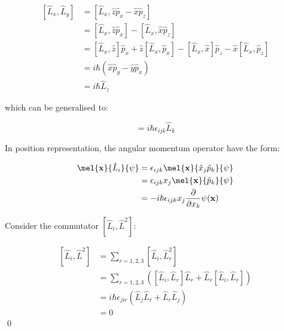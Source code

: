 \documentclass[12pt]{article}
\begin{document}

\begin{equation}
\begin{split}
    [\hat{L}_{x}, \hat{L}_{y}] &= [\hat{L}_{x}, \hat{z} \hat{p}_{x} - \hat{x} \hat{p}_{z}] \\
    &= [\hat{L}_{x}, \hat{z} \hat{p}_{x}] - [\hat{L}_{x}, \hat{x} \hat{p}_{z}] \\
    &= [\hat{L}_{x}, \hat{z}] \hat{p}_{x} + \hat{z} [\hat{L}_{x}, \hat{p}_{x}] - [\hat{L}_{x}, \hat{x}] \hat{p}_{z} - \hat{x} [\hat{L}_{x}, \hat{p}_{z}] \\
    &= i\hbar (\hat{x} \hat{p}_{y} - \hat{y} \hat{p}_{x}) \\
    &= i\hbar \hat{L}_{z}
\end{split}
\end{equation}

which can be generalised to:

\begin{equation}
    [\hat{L}_{i}, \hat{L}_{j}] = i\hbar \epsilon_{ijk} \hat{L}_{k}
\end{equation}

In position representation, the angular momentum operator have the form:

\begin{equation}
\begin{split}
    \mel{\mathbf{x}}{\hat{L}_{i}}{\psi} &= \epsilon_{ijk} \mel{\mathbf{x}}{\hat{x}_{j} \hat{p}_{k}}{\psi} \\
    &= \epsilon_{ijk} x_{j} \mel{\mathbf{x}}{\hat{p}_{k}}{\psi} \\
    &= -i\hbar \epsilon_{ijk} x_{j} \frac{\partial}{\partial x_{k}} \psi(\mathbf{x})
\end{split}
\end{equation}

Consider the commutator $[\hat{L}_{i}, \hat{L}^{2}]$:

\begin{equation}
\begin{split}
    [\hat{L}_{i}, \hat{L}^{2}] &= \sum_{r = 1, 2, 3} [\hat{L}_{i}, \hat{L}_{r}^{2}] \\
    &= \sum_{r = 1, 2, 3} \left( [\hat{L}_{i}, \hat{L}_{r}] \hat{L}_{r} + \hat{L}_{r} [\hat{L}_{i}, \hat{L}_{r}] \right) \\
    &= i\hbar \epsilon_{jir} (\hat{L}_{j} \hat{L}_{r} + \hat{L}_{r} \hat{L}_{j}) \\
    &= 0
\end{split}
\end{equation}
\qed
\end{document}
